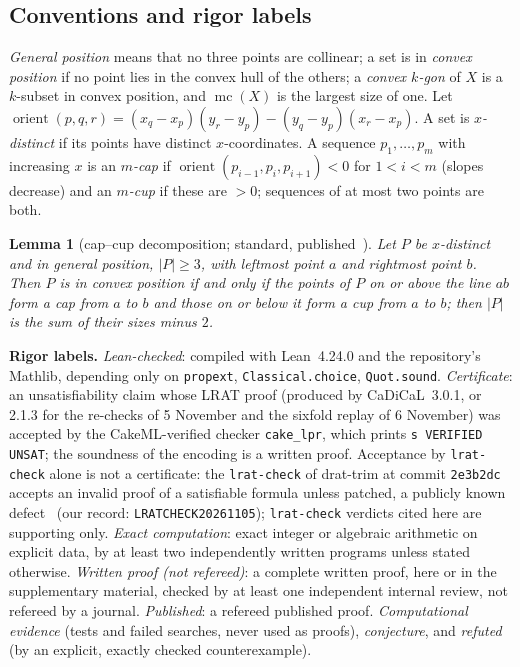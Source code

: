 \documentclass[10pt]{article}
\newtheorem{lemma}[theorem]{Lemma}
\theoremstyle{definition}
\theoremstyle{remark}
\newcommand{\orient}{\operatorname{orient}}
\newcommand{\mc}{\operatorname{mc}}
\newcommand{\dirn}[1]{{\upshape\nolinkurl{#1}}}
\newcommand{\lean}[1]{{\upshape\nolinkurl{#1}}}
\begin{document}
\subsection{Conventions and rigor labels}

\emph{General position} means that no three points are collinear; a set is in \emph{convex position} if no point lies
in the convex hull of the others; a \emph{convex $k$-gon} of $X$ is a $k$-subset in convex position, and $\mc(X)$ is
the largest size of one. Let $\orient(p,q,r)=(x_q-x_p)(y_r-y_p)-(y_q-y_p)(x_r-x_p)$. A set is \emph{$x$-distinct} if its
points have distinct $x$-coordinates. A sequence $p_1,\dots,p_m$ with increasing $x$ is an \emph{$m$-cap} if
$\orient(p_{i-1},p_i,p_{i+1})<0$ for $1<i<m$ (slopes decrease) and an \emph{$m$-cup} if these are $>0$; sequences of at
most two points are both.

\begin{lemma}[cap--cup decomposition; standard, published~\cite{ES35}]\label{lem:capcup}
Let $P$ be $x$-distinct and in general position, $|P|\ge3$, with leftmost point $a$ and rightmost point $b$. Then $P$ is
in convex position if and only if the points of $P$ on or above the line $ab$ form a cap from $a$ to $b$ and those on
or below it form a cup from $a$ to $b$; then $|P|$ is the sum of their sizes minus $2$.
\end{lemma}

\noindent\textbf{Rigor labels.}
\emph{Lean-checked}: compiled with Lean~4.24.0 and the repository's Mathlib, depending only on \lean{propext},
\lean{Classical.choice}, \lean{Quot.sound}. \emph{Certificate}: an unsatisfiability claim whose LRAT proof (produced
by CaDiCaL~3.0.1, or 2.1.3 for the re-checks of 5 November and the sixfold replay of 6 November) was accepted by the CakeML-verified checker
\texttt{cake\_lpr}, which prints \texttt{s VERIFIED UNSAT}; the soundness of the encoding is a written proof. Acceptance by
\texttt{lrat-check} alone is not a certificate: the \texttt{lrat-check} of drat-trim at commit \texttt{2e3b2dc} accepts an
invalid proof of a satisfiable formula unless patched, a publicly known defect~\cite{DT} (our record:
\dirn{LRATCHECK20261105}); \texttt{lrat-check} verdicts cited here are supporting only. \emph{Exact
computation}: exact integer or algebraic arithmetic on explicit data, by at least two independently written programs
unless stated otherwise. \emph{Written proof (not refereed)}: a complete written proof, here or in the supplementary
material, checked by at least one independent internal review, not refereed by a journal. \emph{Published}: a refereed
published proof. \emph{Computational evidence} (tests and failed searches, never used as proofs), \emph{conjecture},
and \emph{refuted} (by an explicit, exactly checked counterexample).
\end{document}
